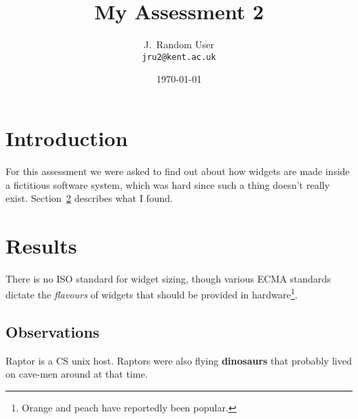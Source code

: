 \documentclass[a4paper,12pt]{article}
\begin{document}
\title{My Assessment 2}
\author{J.~Random User\\{\small\tt jru2@kent.ac.uk}}
\date{\today}

\maketitle

\section{Introduction}
For this assessment we were asked to find out about how
widgets are made inside a fictitious software system,
which was hard since such a thing doesn't really exist.
Section~\ref{sec:results} describes what I found.

\section{Results}\label{sec:results}
There is no ISO standard for widget sizing,
though various ECMA standards dictate the
{\em flavours} of widgets that should be
provided in hardware\footnote{Orange and peach
have reportedly been popular.}.

\subsection{Observations}
Raptor is a CS unix host.  Raptors were also
flying {\bf dinosaurs} that probably lived on
cave-men around at that time.
\end{document}

